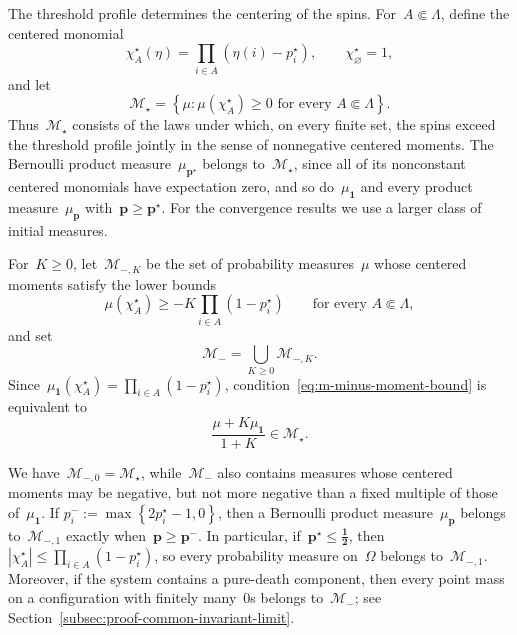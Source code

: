 \documentclass[EJP,preprint,NODS,nobera]{ejpecp}
\newcommand{\bb}[1]{\left(#1\right)}
\newcommand{\cb}[1]{\left\{#1\right\}}
\newcommand{\abs}[1]{\left|#1\right|}
\newcommand{\vn}{\varnothing}
\newcommand{\mb}[1]{\mathbf{#1}}
\newcommand{\mbs}[1]{\boldsymbol{#1}}
\begin{document}
The threshold profile determines the centering of the spins. For~$A\Subset\Lambda$, define the centered monomial
\begin{equation*}
\chi_A^\star(\eta)
=
\prod_{i\in A}\bb{\eta(i)-p_i^\star},
\qquad
\chi_\vn^\star=1,
\end{equation*}
and let
\begin{equation}
\label{eq:m-star-definition-revision}
\mathcal M_\star
=
\cb{
\mu:
\mu\bb{\chi_A^\star}\geq0
\text{ for every }A\Subset\Lambda
}.
\end{equation}
Thus~$\mathcal M_\star$ consists of the laws under which, on every finite
set, the spins exceed the threshold profile jointly in the sense of
nonnegative centered moments. The Bernoulli product measure~$\mu_{\mb p^\star}$
belongs to~$\mathcal M_\star$, since all of its nonconstant centered
monomials have expectation zero, and so do~$\mu_{\mb 1}$ and every product
measure~$\mu_{\mb p}$ with~$\mb p\geq\mb p^\star$. For the convergence results
we use a larger class of initial measures.

\begin{definition}
\label{def:m-minus}
For~$K\geq0$, let~$\mathcal M_{-,K}$ be the set of probability measures~$\mu$
whose centered moments satisfy the lower bounds
\begin{equation}
\label{eq:m-minus-moment-bound}
\mu\bb{\chi_A^\star}
\geq
-K\prod_{i\in A}\bb{1-p_i^\star}
\qquad
\text{for every }A\Subset\Lambda,
\end{equation}
and set
\begin{equation*}
\mathcal M_-
=
\bigcup_{K\geq0}\mathcal M_{-,K}.
\end{equation*}
Since~$\mu_{\mb 1}\bb{\chi_A^\star}=\prod_{i\in A}\bb{1-p_i^\star}$,
condition~\eqref{eq:m-minus-moment-bound} is equivalent to
\begin{equation}
\label{eq:m-minus-affine-characterization}
\frac{\mu+K\mu_{\mb 1}}{1+K}\in\mathcal M_\star .
\end{equation}
\end{definition}

\begin{remark}
\label{rem:m-minus-examples}
We have~$\mathcal M_{-,0}=\mathcal M_\star$, while~$\mathcal M_-$ also
contains measures whose centered moments may be negative, but not more
negative than a fixed multiple of those of~$\mu_{\mb 1}$. If
$p_i^-:=\max\cb{2p_i^\star-1,0}$, then a Bernoulli product
measure~$\mu_{\mb p}$ belongs to~$\mathcal M_{-,1}$ exactly
when~$\mb p\geq\mb p^-$. In particular, if~$\mb p^\star\leq\mbs{\tfrac12}$,
then~$\abs{\chi_A^\star}\leq\prod_{i\in A}\bb{1-p_i^\star}$, so every
probability measure on~$\Omega$ belongs to~$\mathcal M_{-,1}$. Moreover,
if the system contains a pure-death component, then every point mass on a
configuration with finitely many~$0$s belongs to~$\mathcal M_-$; see
Section~\ref{subsec:proof-common-invariant-limit}.
\end{remark}
\end{document}
